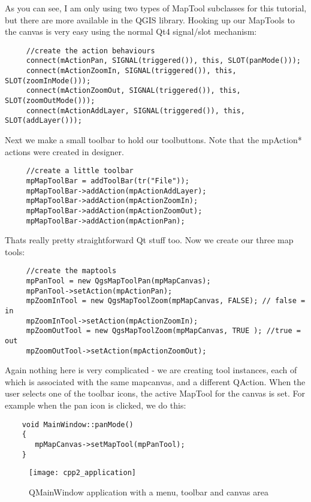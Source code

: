 As you can see, I am only using two types of MapTool subclasses for this
tutorial, but there are more available in the QGIS library. Hooking up our
MapTools to the canvas is very easy using the normal Qt4 signal/slot mechanism:

\begin{verbatim}
     //create the action behaviours
     connect(mActionPan, SIGNAL(triggered()), this, SLOT(panMode()));
     connect(mActionZoomIn, SIGNAL(triggered()), this, SLOT(zoomInMode()));
     connect(mActionZoomOut, SIGNAL(triggered()), this, SLOT(zoomOutMode()));
     connect(mActionAddLayer, SIGNAL(triggered()), this, SLOT(addLayer()));
\end{verbatim}

Next we make a small toolbar to hold our toolbuttons. Note that the mpAction*
actions were created in designer.

\begin{verbatim}
     //create a little toolbar
     mpMapToolBar = addToolBar(tr("File"));
     mpMapToolBar->addAction(mpActionAddLayer);
     mpMapToolBar->addAction(mpActionZoomIn);
     mpMapToolBar->addAction(mpActionZoomOut);
     mpMapToolBar->addAction(mpActionPan);
\end{verbatim}

Thats really pretty straightforward Qt stuff too. Now we create our three map
tools:

\begin{verbatim}
     //create the maptools
     mpPanTool = new QgsMapToolPan(mpMapCanvas);
     mpPanTool->setAction(mpActionPan);
     mpZoomInTool = new QgsMapToolZoom(mpMapCanvas, FALSE); // false = in
     mpZoomInTool->setAction(mpActionZoomIn);
     mpZoomOutTool = new QgsMapToolZoom(mpMapCanvas, TRUE ); //true = out
     mpZoomOutTool->setAction(mpActionZoomOut);
\end{verbatim}

Again nothing here is very complicated - we are creating tool instances, each
of which is associated with the same mapcanvas, and a different QAction. When
the user selects one of the toolbar icons, the active MapTool for the canvas is
set. For example when the pan icon is clicked, we do this:

\begin{verbatim}
    void MainWindow::panMode()
    {
       mpMapCanvas->setMapTool(mpPanTool); 
    }
\end{verbatim}

\begin{figure}[ht]
   \begin{center}
   \caption{QMainWindow application with a menu, toolbar and canvas area
\osxcaption}\label{fig:cpp2_application}\smallskip
   \texttt{[image: cpp2\_application]}
\end{center}
\end{figure}

